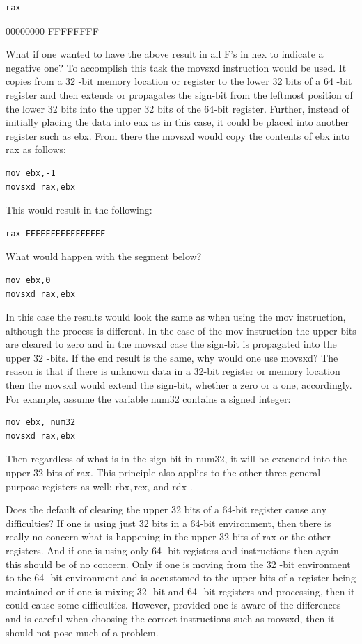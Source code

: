 \documentclass[10pt]{article}
\begin{document}
\begin{verbatim}
rax
\end{verbatim}

00000000 FFFFFFFF

What if one wanted to have the above result in all F's in hex to indicate a negative one? To accomplish this task the movsxd instruction would be used. It copies from a 32 -bit memory location or register to the lower 32 bits of a 64 -bit register and then extends or propagates the sign-bit from the leftmost position of the lower 32 bits into the upper 32 bits of the 64-bit register. Further, instead of initially placing the data into eax as in this case, it could be placed into another register such as ebx. From there the movsxd would copy the contents of ebx into rax as follows:

\begin{verbatim}
mov ebx,-1
movsxd rax,ebx
\end{verbatim}

This would result in the following:

\begin{verbatim}
rax FFFFFFFFFFFFFFFF
\end{verbatim}

What would happen with the segment below?

\begin{verbatim}
mov ebx,0
movsxd rax,ebx
\end{verbatim}

In this case the results would look the same as when using the mov instruction, although the process is different. In the case of the mov instruction the upper bits are cleared to zero and in the movsxd case the sign-bit is propagated into the upper 32 -bits. If the end result is the same, why would one use movsxd? The reason is that if there is unknown data in a 32-bit register or memory location then the movsxd would extend the sign-bit, whether a zero or a one, accordingly. For example, assume the variable num32 contains a signed integer:

\begin{verbatim}
mov ebx, num32
movsxd rax,ebx
\end{verbatim}

Then regardless of what is in the sign-bit in num32, it will be extended into the upper 32 bits of rax. This principle also applies to the other three general purpose registers as well: $\mathrm{rbx}, \mathrm{rcx}$, and rdx .

Does the default of clearing the upper 32 bits of a 64-bit register cause any difficulties? If one is using just 32 bits in a 64-bit environment, then there is really no concern what is happening in the upper 32 bits of rax or the other registers. And if one is using only 64 -bit registers and instructions then again this should be of no concern. Only if one is moving from the 32 -bit environment to the 64 -bit environment and is accustomed to the upper bits of a register being maintained or if one is mixing 32 -bit and 64 -bit registers and processing, then it could cause some difficulties. However, provided one is aware of the differences and is careful when choosing the correct instructions such as movsxd, then it should not pose much of a problem.
\end{document}
